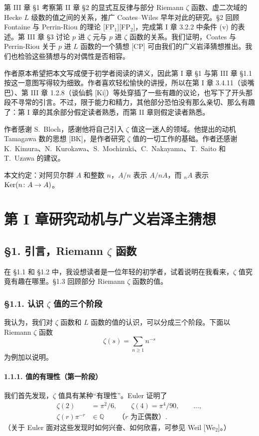 第 III 章 §1 考察第 II 章 §2 的显式互反律与部分 Riemann $\zeta$ 函数、虚二次域的 Hecke $L$ 级数的值之间的关系，推广 Coates--Wiles 早年对此的研究。§2 回顾 Fontaine 与 Perrin-Riou 的理论 [FP$_1$][FP$_2$]，完成第 I 章 3.2.2 中条件 (v) 的表述。第 III 章 §3 讨论 $p$ 进 $\zeta$ 元与 $p$ 进 $\zeta$ 函数的关系。我们证明，Coates 与 Perrin-Riou 关于 $p$ 进 $L$ 函数的一个猜想 [CP] 可由我们的广义岩泽猜想推出。我们也检验这些猜想与的对偶性是否相容。

作者原本希望把本文写成便于初学者阅读的讲义，因此第 I 章 §1 与第 III 章 §1.1 按这一意图写得较为细致。作者喜欢轻松愉快的讲授，所以在第 I 章 3.4.11（谈嘴巴）、第 III 章 1.2.8（谈仙鹤 [Ki]）等处穿插了一些有趣的议论，也写下了开头那段不寻常的引言。不过，限于能力和精力，其他部分恐怕没有那么亲切、那么有趣了：第 I 章的其余部分假定读者熟悉，而第 II 章则假定读者熟悉。

作者感谢 S.~Bloch，感谢他将自己引入 $\zeta$ 值这一迷人的领域。他提出的动机 Tamagawa 数的思想 [BK]，是作者研究 $\zeta$ 值的一切工作的基础。作者还感谢 K.~Kimura、N.~Kurokawa、S.~Mochizuki、C.~Nakayama、T.~Saito 和 T.~Uzawa 的建议。

本文约定：对阿贝尔群 $A$ 和整数 $n$，$A/n$ 表示 $A/nA$，而 ${}_nA$ 表示 $\operatorname{Ker}(n\colon A\to A)$。

\section*{第 I 章\quad 研究动机与广义岩泽主猜想}
\subsection*{§1. 引言，Riemann $\zeta$ 函数}
在 §1.1 和 §1.2 中，我设想读者是一位年轻的初学者，试着说明在我看来，$\zeta$ 值究竟有趣在哪里。§1.3 回顾部分 Riemann $\zeta$ 函数的值。

\subsubsection*{§1.1. 认识 $\zeta$ 值的三个阶段}
我认为，我们对 $\zeta$ 函数和 $L$ 函数的值的认识，可以分成三个阶段。下面以 Riemann $\zeta$ 函数
\[
\zeta(s)=\sum_{n\geq1}n^{-s}
\]
为例加以说明。

\paragraph{1.1.1. 值的有理性（第一阶段）}
我们首先发现，$\zeta$ 值具有某种“有理性”。Euler 证明了
\begin{align*}
\zeta(2)&=\pi^2/6,\qquad \zeta(4)=\pi^4/90,\qquad\ldots,\tag{1}\\
\zeta(r)\pi^{-r}&\in\mathbb Q\qquad\text{（$r$ 为正偶数）}.\tag{2}
\end{align*}
（关于 Euler 面对这些发现时如何兴奋、如何欣喜，可参见 Weil [We$_2$]。）

